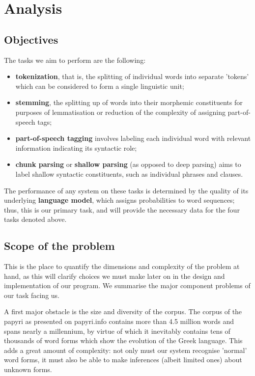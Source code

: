 
\chapter{Analysis}
\label{chp:analysis}

\section{Objectives}
The tasks we aim to perform are the following: 

\begin{itemize}
\item \textbf{tokenization}, that is, the splitting of individual
  words into separate 'tokens' which can be considered to form a single
  linguistic unit;
\item \textbf{stemming}, the splitting up of words into their morphemic
  constituents for purposes of lemmatisation or reduction of the
  complexity of assigning part-of-speech tags;
\item \textbf{part-of-speech tagging} involves labeling each
  individual word with relevant information indicating its syntactic
  role;
\item \textbf{chunk parsing} or \textbf{shallow parsing} (as opposed to deep parsing)
  aims to label shallow syntactic constituents, such as individual
  phrases and clauses.
\end{itemize}

The performance of any system on these tasks is determined by the
quality of its underlying \textbf{language model}, which assigns
probabilities to word sequences; thus, this is our primary task, and
will provide the necessary data for the four tasks denoted above.

\section{Scope of the problem}
This is the place to quantify the dimensions and complexity of the
problem at hand, as this will clarify choices we must make later on in
the design and implementation of our program. We summarise the major
component problems of our task facing us.

A first major obstacle is the size and diversity of the corpus. The
corpus of the papyri as presented on papyri.info contains more than
4.5 million words and spans nearly a millennium, by virtue of which it
inevitably contains tens of thousands of word forms which show the
evolution of the Greek language. This adds a great amount of
complexity: not only must our system recognise 'normal' word forms, it
must also be able to make inferences (albeit limited ones) about
unknown forms. 


